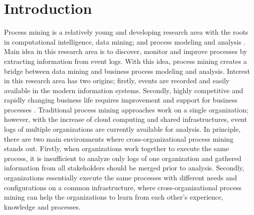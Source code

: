 \section{Introduction}
\label{sec:intro}

Process mining is a relatively young and developing research area with the roots in computational intelligence, data mining; and process modeling and analysis \cite{van2012process}. Main idea in this research area is to discover, monitor and improve processes by extracting information from event logs. With this idea, process mining creates a bridge between data mining and business process modeling and analysis. Interest in this research area has two origins; firstly, events are recorded and easily available in the modern information systems. Secondly, highly competitive and rapidly changing business life requires improvement and support for business processes \cite{van2012process}. Traditional process mining approaches work on a single organization; however, with the increase of cloud computing and shared infrastructures, event logs of multiple organizations are currently available for analysis. In principle, there are two main environments where cross-organizational process mining stands out. Firstly, when organizations work together to execute the same process, it is insufficient to analyze only logs of one organization and gathered information from all stakeholders should be merged prior to analysis. Secondly, organizations essentially execute the same processes with different needs and configurations on a common infrastructure, where cross-organizational process mining can help the organizations to learn from each other's experience, knowledge and processes.
